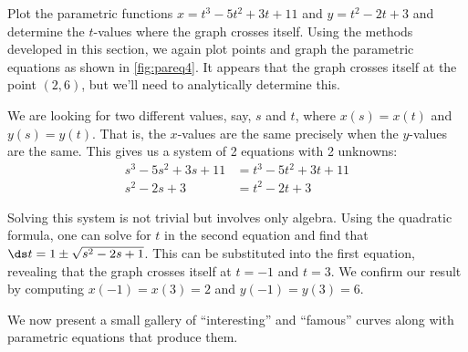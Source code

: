 \begin{example}\label{ex_pareq4}
Plot the parametric functions $x=t^3-5t^2+3t+11$ and $y=t^2-2t+3$ and determine the $t$-values where the graph crosses itself.
\solution
Using the methods developed in this section, we again plot points and graph the parametric equations as shown in \autoref{fig:pareq4}. It appears that the graph crosses itself at the point $(2,6)$, but we'll need to analytically determine this.

We are looking for two different values, say, $s$ and $t$, where $x(s) = x(t)$ and $y(s) = y(t)$. That is, the $x$-values are the same precisely when the $y$-values are the same. This gives us a system of 2 equations with 2 unknowns:
%
%
\begin{align*}
s^3-5s^2+3s+11 &= t^3-5t^2+3t+11 \\
s^2-2s+3 &= t^2-2t+3
\end{align*}

Solving this system is not trivial but involves only algebra. Using the quadratic formula, one can solve for $t$ in the second equation and find that $\ds t = 1\pm \sqrt{s^2-2s+1}$. This can be substituted into the first equation, revealing that the graph crosses itself at $t=-1$ and $t=3$. We confirm our result by computing $x(-1) = x(3)=2$ and $y(-1) = y(3) = 6$.
\end{example}

We now present a small gallery of ``interesting'' and ``famous'' curves along with parametric equations that produce them.\bigskip\vfill

